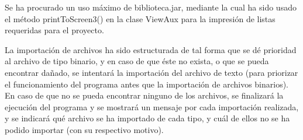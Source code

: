 \documentclass[fleqn]{article}
\begin{document}
    Se ha procurado un uso máximo de biblioteca.jar, mediante la cual ha sido usado el método printToScreen3() en la clase ViewAux para la impresión
    de listas requeridas para el proyecto.

    La importación de archivos ha sido estructurada de tal forma que se dé prioridad al archivo de tipo binario, y en caso de que éste no exista, 
    o que se pueda encontrar dañado, se intentará la importación del archivo de texto (para priorizar el funcionamiento del programa antes que la importación
    de archivos binarios). En caso de que no se pueda encontrar ninguno de los archivos, se finalizará la ejecución del programa y se mostrará un mensaje por cada 
    importación realizada, y se indicará qué archivo se ha importado de cada tipo, y cuál de ellos no se ha podido importar (con su respectivo motivo).
\end{document}
